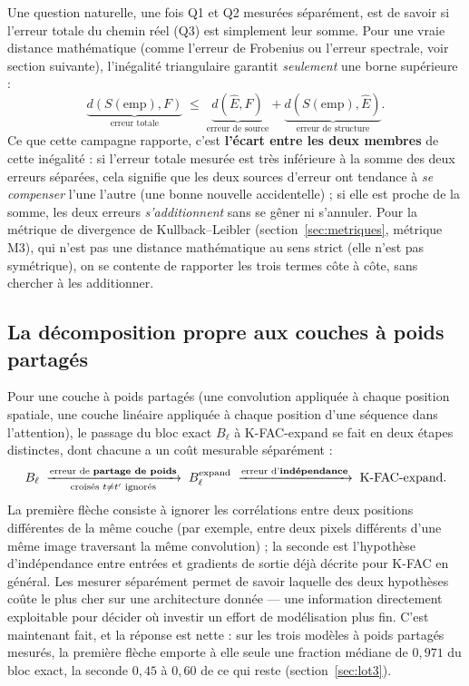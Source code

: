 \documentclass[11pt,a4paper]{article}
\begin{document}
Une question naturelle, une fois Q1 et Q2 mesurées séparément, est de savoir si l'erreur totale du
chemin réel (Q3) est simplement leur somme. Pour une vraie distance mathématique (comme l'erreur de
Frobenius ou l'erreur spectrale, voir section suivante), l'inégalité triangulaire garantit
\emph{seulement} une borne supérieure :
\[
\underbrace{d(S(\text{emp}), F)}_{\text{erreur totale}} \;\le\;
\underbrace{d(\hat E, F)}_{\text{erreur de source}} + \underbrace{d(S(\text{emp}), \hat E)}_{\text{erreur de structure}}.
\]
Ce que cette campagne rapporte, c'est \textbf{l'écart entre les deux membres} de cette inégalité :
si l'erreur totale mesurée est très inférieure à la somme des deux erreurs séparées, cela signifie
que les deux sources d'erreur ont tendance à \emph{se compenser} l'une l'autre (une bonne nouvelle
accidentelle) ; si elle est proche de la somme, les deux erreurs \emph{s'additionnent} sans se gêner
ni s'annuler. Pour la métrique de divergence de Kullback--Leibler (section~\ref{sec:metriques},
métrique M3), qui n'est pas une distance mathématique au sens strict (elle n'est pas symétrique), on
se contente de rapporter les trois termes côte à côte, sans chercher à les additionner.

\subsection{La décomposition propre aux couches à poids partagés}
\label{sec:partage}

Pour une couche à poids partagés (une convolution appliquée à chaque position spatiale, une couche
linéaire appliquée à chaque position d'une séquence dans l'attention), le passage du bloc exact
$B_\ell$ à K-FAC-expand se fait en deux étapes distinctes, dont chacune a un coût mesurable
séparément :
\[
B_\ell \;\xrightarrow[\text{croisés }t\ne t'\text{ ignorés}]{\text{erreur de \textbf{partage de poids}}}\;
B_\ell^{\rm expand} \;\xrightarrow[\ ]{\text{erreur d'\textbf{indépendance}}}\; \text{K-FAC-expand}.
\]
La première flèche consiste à ignorer les corrélations entre deux positions différentes de la même
couche (par exemple, entre deux pixels différents d'une même image traversant la même convolution) ;
la seconde est l'hypothèse d'indépendance entre entrées et gradients de sortie déjà décrite pour
K-FAC en général. Les mesurer séparément permet de savoir laquelle des deux hypothèses coûte le
plus cher sur une architecture donnée — une information directement exploitable pour décider où
investir un effort de modélisation plus fin. C'est maintenant fait, et la réponse est nette :
sur les trois modèles à poids partagés mesurés, la première flèche emporte à elle seule une
fraction médiane de $0{,}971$ du bloc exact, la seconde $0{,}45$ à $0{,}60$ de ce qui reste
(section~\ref{sec:lot3}).
\end{document}
